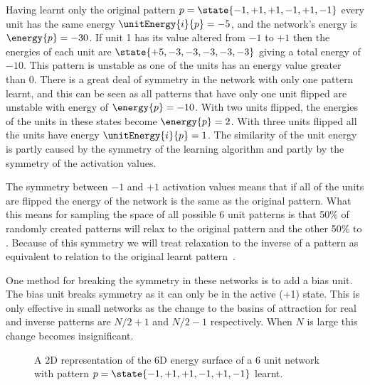 Having learnt only the original pattern $p=\state{-1,+1,+1,-1,+1,-1}$ every unit has the same energy $\unitEnergy{i}{p}=-5$, and the network's energy is $\energy{p}=-30$.  If unit 1 has its value altered from $-1$ to $+1$ then the energies of each unit are $\state{+5,-3,-3,-3,-3,-3}$ giving a total energy of $-10$.  This pattern is unstable as one of the units has an energy value greater than $0$.  There is a great deal of symmetry in the network with only one pattern learnt, and this can be seen as all patterns that have only one unit flipped are unstable with energy of $\energy{p}=-10$.  With two units flipped, the energies of the units in these states become  $\energy{p}=2$.  With three units flipped all the units have energy $\unitEnergy{i}{p}=1$.  The similarity of the unit energy is partly caused by the symmetry of the learning algorithm and partly by the symmetry of the activation values.  

The symmetry between $-1$ and $+1$ activation values means that if all of the units are flipped the energy of the network is the same as the original pattern.  What this means for sampling the space of all possible 6 unit patterns is that 50\% of randomly created patterns will relax to the original pattern  and the other 50\% to . Because of this symmetry we will treat relaxation to the inverse of a pattern as equivalent to relation to the original learnt pattern~\citep{Hopfield82}. 

One method for breaking the symmetry in these networks is to add a bias unit.  The bias unit breaks symmetry as it can only be in the active (+1) state.  This is only effective in small networks as the change to the basins of attraction for real and inverse patterns are $N/2+1$ and $N/2-1$ respectively.  When $N$ is large this change becomes insignificant.

\begin{figure}[ht]
	\center
	\scalebox{0.7}{}
	\caption{A 2D representation of the 6D energy surface of a 6 unit network  with pattern $p=\state{-1,+1,+1,-1,+1,-1}$ learnt.}
	\label{fig:EnergySurfaceHopnet}
\end{figure}

